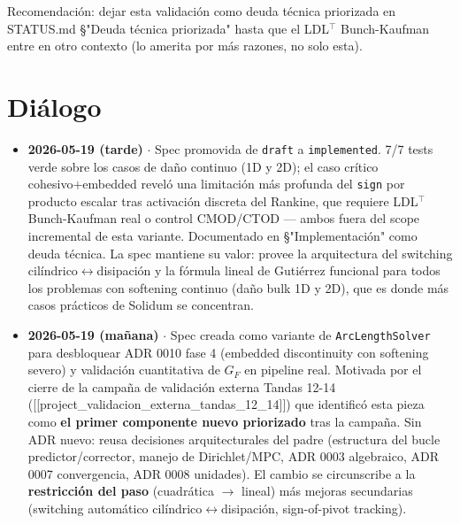 \documentclass[11pt,letterpaper,oneside]{report}
\begin{document}
Recomendación: dejar esta validación como deuda técnica priorizada en STATUS.md §"Deuda técnica priorizada" hasta que el LDL\ensuremath{^{\top}} Bunch-Kaufman entre en otro contexto (lo amerita por más razones, no solo esta).


\section{Diálogo}

\begin{itemize}
  \item \textbf{2026-05-19 (tarde)} \ensuremath{\cdot} Spec promovida de \texttt{draft} a \texttt{implemented}. 7/7 tests verde sobre los casos de daño continuo (1D y 2D); el caso crítico cohesivo+embedded reveló una limitación más profunda del \texttt{sign} por producto escalar tras activación discreta del Rankine, que requiere LDL\ensuremath{^{\top}} Bunch-Kaufman real o control CMOD/CTOD --- ambos fuera del scope incremental de esta variante. Documentado en §"Implementación" como deuda técnica. La spec mantiene su valor: provee la arquitectura del switching cilíndrico\ensuremath{\leftrightarrow}disipación y la fórmula lineal de Gutiérrez funcional para todos los problemas con softening continuo (daño bulk 1D y 2D), que es donde más casos prácticos de Solidum se concentran.
\end{itemize}

\begin{itemize}
  \item \textbf{2026-05-19 (mañana)} \ensuremath{\cdot} Spec creada como variante de \texttt{ArcLengthSolver} para desbloquear ADR 0010 fase 4 (embedded discontinuity con softening severo) y validación cuantitativa de $G_F$ en pipeline real. Motivada por el cierre de la campaña de validación externa Tandas 12-14 ([[project\_validacion\_externa\_tandas\_12\_14]]) que identificó esta pieza como \textbf{el primer componente nuevo priorizado} tras la campaña. Sin ADR nuevo: reusa decisiones arquitecturales del padre (estructura del bucle predictor/corrector, manejo de Dirichlet/MPC, ADR 0003 algebraico, ADR 0007 convergencia, ADR 0008 unidades). El cambio se circunscribe a la \textbf{restricción del paso} (cuadrática \ensuremath{\to} lineal) más mejoras secundarias (switching automático cilíndrico\ensuremath{\leftrightarrow}disipación, sign-of-pivot tracking).
\end{itemize}
\end{document}

